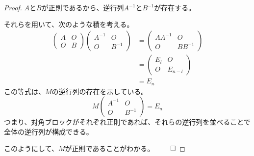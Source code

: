 \documentclass[../../../topic_linear-algebra]{subfiles}
\begin{document}
\begin{proof}
  $A$と$B$が正則であるから、逆行列$A^{-1}$と$B^{-1}$が存在する。

  それらを用いて、次のような積を考える。
  \begin{align*}
    \begin{pmatrix}
      A & O \\
      O & B
    \end{pmatrix} \begin{pmatrix}
                    A^{-1} & O      \\
                    O      & B^{-1}
                  \end{pmatrix} & = \begin{pmatrix}
                                      A A^{-1} & O        \\
                                      O        & B B^{-1}
                                    \end{pmatrix} \\
                                  & = \begin{pmatrix}
                                        E_l & O       \\
                                        O   & E_{n-l}
                                      \end{pmatrix}    \\
                                  & = E_n
  \end{align*}
  この等式は、$M$の逆行列の存在を示している。
  \begin{equation*}
    M \begin{pmatrix}
      A^{-1} & O      \\
      O      & B^{-1}
    \end{pmatrix} = E_n
  \end{equation*}
  つまり、対角ブロックがそれぞれ正則であれば、それらの逆行列を並べることで全体の逆行列が構成できる。

  このようにして、$M$が正則であることがわかる。 $\qed$
\end{proof}
\end{document}
